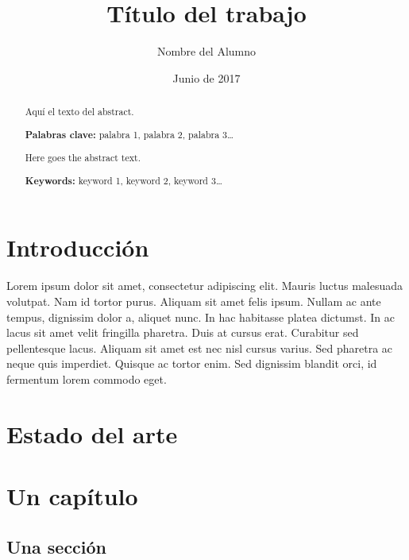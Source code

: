 \documentclass[a4paper, 12pt]{report} %
\author{Nombre del Alumno}
\date{Junio de 2017}
\title{Título del trabajo}
\begin{document}
\maketitle
\null%
\newpage

\tableofcontents
\newpage

\listoffigures
\listoftables
\newpage

\begin{abstract}
  \normalsize
  Aquí el texto del abstract.

  \textbf{Palabras clave:} palabra 1, palabra 2, palabra 3\ldots
\end{abstract}

\begin{otherlanguage}{english}
  \begin{abstract}
    \normalsize
    Here goes the abstract text.

    \textbf{Keywords:} keyword 1, keyword 2, keyword 3\ldots
  \end{abstract}
\end{otherlanguage}

\newpage
{} %

\chapter{Introducción}

Lorem ipsum dolor sit amet, consectetur adipiscing elit. Mauris luctus malesuada
volutpat. Nam id tortor purus. Aliquam sit amet felis ipsum. Nullam ac ante
tempus, dignissim dolor a, aliquet nunc. In hac habitasse platea dictumst. In ac
lacus sit amet velit fringilla pharetra. Duis at cursus erat. Curabitur sed
pellentesque lacus. Aliquam sit amet est nec nisl cursus varius. Sed pharetra ac
neque quis imperdiet. Quisque ac tortor enim. Sed dignissim blandit orci, id
fermentum lorem commodo eget\cite{Recos}.

\chapter{Estado del arte}

\chapter{Un capítulo}

\section{Una sección}
\end{document}
